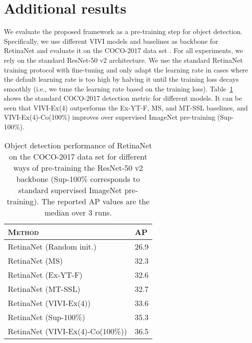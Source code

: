 \documentclass[10pt,twocolumn,letterpaper]{article}
\renewcommand{\paragraph}[1]{\noindent{\bf #1}\quad}
\begin{document}
{\clearpage

\FloatBarrier

\section{Additional results}

\paragraph{Object detection} We evaluate the proposed framework as a pre-training step for object detection. Specifically, we use different VIVI models and baselines as backbone for RetinaNet \cite{lin2017focal} and evaluate it on the COCO-2017 data set \cite{lin2014microsoft}. For all experiments, we rely on the standard ResNet-50 v2 architecture. We use the standard RetinaNet training protocol with fine-tuning and only adapt the learning rate in cases where the default learning rate is too high by halving it until the training loss decays smoothly (i.e., we tune the learning rate based on the training loss). Table~\ref{tab:coco-detection} shows the standard COCO-2017 detection metric for different models. It can be seen that VIVI-Ex(4) outperforms the Ex-YT-F, MS, and MT-SSL baselines, and VIVI-Ex(4)-Co(100\%) improves over supervised ImageNet pre-training (Sup-100\%).

\begin{table}[h!]
    \centering
    \small
\begin{tabular}{ll}
\toprule
\textsc{Method} & \textsc{AP} \\
\midrule
RetinaNet (Random init.) & 26.9 \\
RetinaNet (MS) & 32.3 \\
RetinaNet (Ex-YT-F) & 32.6 \\
RetinaNet (MT-SSL) & 32.7 \\
RetinaNet (VIVI-Ex(4)) & 33.6 \\
RetinaNet (Sup-100\%) & 35.3 \\
RetinaNet (VIVI-Ex(4)-Co(100\%)) & 36.5 \\
\bottomrule
\end{tabular}     \caption{Object detection performance of RetinaNet \cite{lin2017focal} on the COCO-2017 data set \cite{lin2014microsoft} for different ways of pre-training the ResNet-50 v2 backbone (Sup-100\% corresponds to standard supervised ImageNet pre-training). The reported AP values are the median over 3 runs.}
    \label{tab:coco-detection}
\end{table}




}
\end{document}
